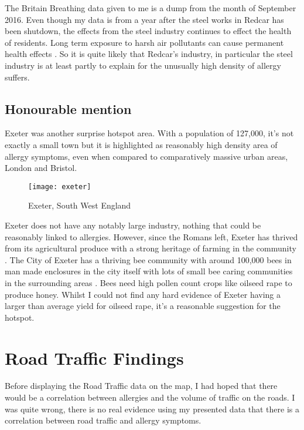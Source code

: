 The Britain Breathing data given to me is a dump from the month of September 2016. Even though my data is from a year after the steel works in Redcar has been shutdown, the effects from the steel industry continues to effect the health of residents. Long term exposure to harsh air pollutants can cause permanent health effects \cite{longterm}. So it is quite likely that Redcar's industry, in particular the steel industry is at least partly to explain for the unusually high density of allergy suffers.\\

\subsection{Honourable mention}

Exeter was another surprise hotspot area. With a population of 127,000, it's not exactly a small town but it is highlighted as reasonably high density area of allergy symptoms, even when compared to comparatively massive urban areas,  London and Bristol.\\

\begin{figure}[H]
\begin{center}
\texttt{[image: exeter]}
\label{fig:exeter}
\caption{Exeter, South West England}
\end{center}
\end{figure}

Exeter does not have any notably large industry, nothing that could be reasonably linked to allergies. However, since the Romans left, Exeter has thrived from its agricultural produce with a strong heritage of farming in the community \cite{oldexeter}. The City of Exeter has a thriving bee community with around 100,000 bees in man made enclosures in the city itself with lots of small bee caring communities in the surrounding areas \cite{beeproj}. Bees need high pollen count crops like oilseed rape to produce honey. Whilst I could not find any hard evidence of Exeter having a larger than average yield for oilseed rape, it's a reasonable suggestion for the hotspot.

\section{Road Traffic Findings}

Before displaying the Road Traffic data on the map, I had hoped that there would be a correlation between allergies and the volume of traffic on the roads. I was quite wrong, there is no real evidence using my presented data that there is a correlation between road traffic and allergy symptoms.\\

